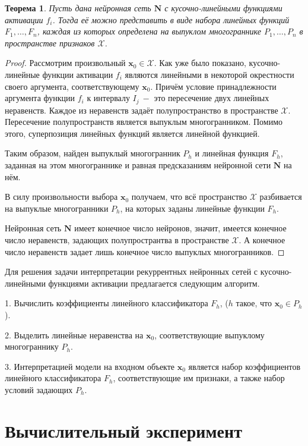 \documentclass[a4paper, 12pt]{article}
\newtheorem{theorem}{Теорема}
\begin{document}
\begin{theorem}
Пусть дана нейронная сеть $\mathbf{N}$ с кусочно-линейными функциями активации $f_i$. Тогда её можно представить в виде набора линейных функций $F_1,\dots,F_n$, каждая из которых определена на выпуклом многограннике $P_1,\dots,P_n$ в пространстве признаков $\mathcal{X}$.
\end{theorem}
\begin{proof}
Рассмотрим произвольный $\mathbf{x}_0\in\mathcal{X}$. Как уже было показано, кусочно-линейные функции активации $f_i$ являются линейными в некоторой окрестности своего аргумента, соответствующему $\mathbf{x}_0$. Причём условие принадлежности аргумента функции $f_i$ к интервалу $I_j~-$ это пересечение двух линейных неравенств. Каждое из неравенств задаёт полупространство в пространстве $\mathcal{X}$. Пересечение полупространств является выпуклым многогранником. Помимо этого, суперпозиция линейных функций является линейной функцией.

Таким образом, найден выпуклый многогранник $P_h$ и линейная функция $F_h$, заданная на этом многограннике и равная предсказаниям нейронной сети $\mathbf{N}$ на нём.

В силу произвольности выбора $\mathbf{x}_0$ получаем, что всё пространство $\mathcal{X}$ разбивается на выпуклые многогранники $P_h$, на которых заданы линейные функции $F_h$.

Нейронная сеть $\mathbf{N}$ имеет конечное число нейронов, значит, имеется конечное число неравенств, задающих полупространтва в пространстве $\mathcal{X}$. А конечное число неравенств задает лишь конечное число выпуклых многогранников. 
\end{proof}

Для решения задачи интерпретации рекуррентных нейронных сетей с кусочно-линейными функциями активации предлагается следующим алгоритм.

1. Вычислить коэффициенты линейного классификатора $F_h$, ($h$ такое, что $\mathbf{x}_0\in P_h$).

2. Выделить линейные неравенства на $\mathbf{x}_0$, соответствующие выпуклому многограннику $P_h$.

3. Интерпретацией модели на входном объекте $\mathbf{x}_0$ является набор коэффициентов линейного классификатора $F_h$, соответствующие им признаки, а также набор условий задающих $P_h$.

\section{Вычислительный эксперимент}
\end{document}

